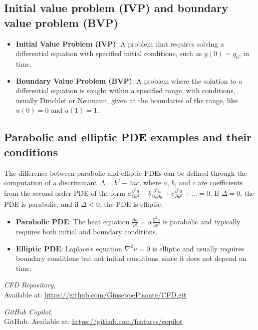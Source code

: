 \documentclass{article}
\begin{document}
\subsection{Initial value problem (IVP) and boundary value problem (BVP)}
\begin{itemize}
    \item \textbf{Initial Value Problem (IVP)}: A problem that requires solving a differential equation with specified initial conditions, such as \( y(0) = y_0 \), in time.
    \item \textbf{Boundary Value Problem (BVP)}: A problem where the solution to a differential equation is sought within a specified range, with conditions, usually Dirichlet or Neumann, given at the boundaries of the range, like \( u(0) = 0 \) and \( u(1) = 1 \).
\end{itemize}

\subsection{Parabolic and elliptic PDE examples and their conditions}
The difference between parabolic and elliptic PDEs can be defined through the computation of a discriminant \( \Delta = b^2 - 4ac \), where \( a \), \( b \), and \( c \) are coefficients from the second-order PDE of the form \( a \frac{\partial^2 u}{\partial x^2} + b \frac{\partial^2 u}{\partial x \partial y} + c \frac{\partial^2 u}{\partial y^2} + \ldots = 0 \). If \( \Delta = 0 \), the PDE is parabolic, and if \( \Delta < 0 \), the PDE is elliptic.
\begin{itemize}
    \item \textbf{Parabolic PDE}: The heat equation \( \frac{\partial u}{\partial t} = \alpha \frac{\partial^2 u}{\partial x^2} \) is parabolic and typically requires both initial and boundary conditions.
    \item \textbf{Elliptic PDE}: Laplace's equation \( \nabla^2 u = 0 \) is elliptic and usually requires boundary conditions but not initial conditions, since it does not depend on time.
\end{itemize}

\begin{thebibliography}{9}
    \textit{CFD Repository},\\
    Available at: \url{https://github.com/GiuseppePisante/CFD.git}
    
    \textit{GitHub Copilot},\\
    GitHub. Available at: \url{https://github.com/features/copilot}
    \end{thebibliography}
\end{document}
